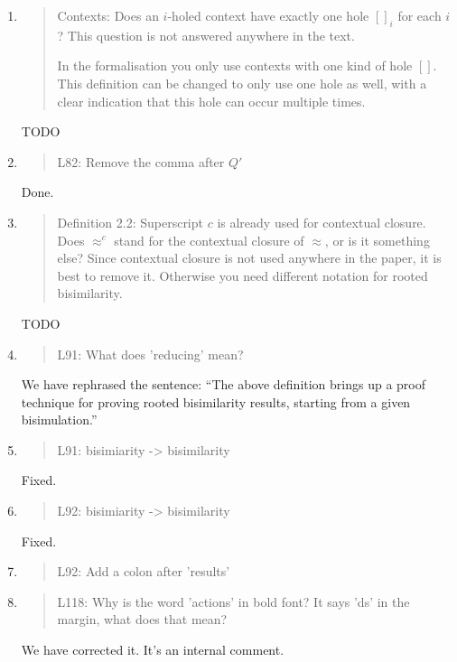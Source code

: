 \begin{enumerate}
\item \begin{quote}
  Contexts: Does an $i$-holed context have exactly one hole $[]_i$ for
  each $i$? This question is not answered anywhere in the text.

  In the formalisation you only use contexts with one kind of hole $[]$. This definition can be changed to only
  use one hole as well, with a clear indication that this hole can occur multiple times.
\end{quote}
TODO

\item \begin{quote}
    L82: Remove the comma after $Q'$
  \end{quote}
  Done.
  
\item \begin{quote}
    Definition 2.2: Superscript $c$ is already used for contextual closure.
    Does $\approx^c$ stand for the contextual closure of $\approx$, or is it something else?
    Since contextual closure is not used anywhere in the paper, it is best to remove it.
    Otherwise you need different notation for rooted bisimilarity.
  \end{quote}
  TODO
  
\item \begin{quote}
    L91: What does 'reducing' mean?
  \end{quote}
We have rephrased the sentence: ``The above definition brings up a
proof technique for proving rooted bisimilarity results, starting from
a given bisimulation.''

\item \begin{quote}
    L91: bisimiarity -> bisimilarity
  \end{quote}
  Fixed.

\item \begin{quote}
    L92: bisimiarity -> bisimilarity
  \end{quote}
  Fixed.
  
\item \begin{quote}
    L92: Add a colon after 'results'
  \end{quote}

\item \begin{quote}
    L118: Why is the word 'actions' in bold font? It says 'ds' in the margin, what does that mean?
  \end{quote}
  We have corrected it. It's an internal comment.
  

\end{enumerate}
